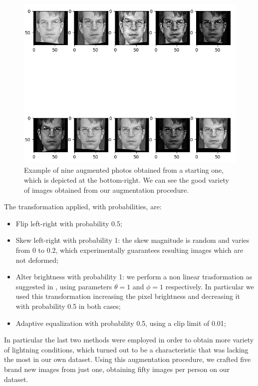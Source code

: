 \begin{figure}[t]
\includegraphics[width=1\linewidth]{images/augmented.png}
\caption{Example of nine augmented photos obtained from a starting one, which is depicted at the bottom-right. We can see the good variety of images obtained from our augmentation procedure.}
\label{fig:long}
\label{fig:onecol}
\end{figure}

The transformation applied, with probabilities, are:
\begin{itemize}
\item Flip left-right with probability 0.5;
\item Skew left-right with probability 1: the skew magnitude is random and varies from 0 to 0.2, which experimentally guarantees resulting images which are not deformed;
\item Alter brightness with probability 1: we perform a non linear trasformation as suggested in \cite{nonlintransf}, using parameters $\theta = 1$ and $\phi = 1$ respectively. In particular we used this transformation increasing the pixel brightness and decreasing it with probability 0.5 in both cases;
\item Adaptive equalization \cite{histeq} with probability 0.5, using a clip limit of 0.01;
\end{itemize}
In particular the last two methods were employed in order to obtain more variety of lightning conditions, which turned out to be a characteristic that was lacking the most in our own dataset.
Using this augmentation procedure, we crafted five brand new images from just one, obtaining fifty images per person on our dataset.

